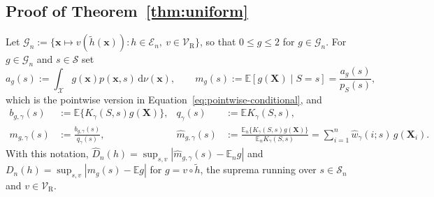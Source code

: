 \subsection{Proof of Theorem~\ref{thm:uniform}}
\label{app:proof-uniform}

Let $\mathcal{G}_n:=\{\mathbf{x}\mapsto v(\widetilde{h}(\mathbf{x})):h\in\mathcal{E}_n,\ v\in\mathcal{V}_{\mathrm{R}}\}$, so that $0\le g\le2$ for $g\in\mathcal{G}_n$.  For $g\in\mathcal{G}_n$ and $s\in\mathcal{S}$ set
\[
  a_g(s):=\int_{\mathcal{X}}g(\mathbf{x})p(\mathbf{x},s)\,\mathrm{d}\nu(\mathbf{x}),
  \qquad
  m_g(s):=\mathbb{E}[g(\mathbf{X})\mid S=s]=\frac{a_g(s)}{p_S(s)},
\]
which is the pointwise version in Equation~\ref{eq:pointwise-conditional}, and
\begin{align*}
  b_{g,\gamma}(s)&:=\mathbb{E}\{K_{\gamma}(S,s)g(\mathbf{X})\},&
  q_\gamma(s)&:=\mathbb{E}K_{\gamma}(S,s),\\
  m_{g,\gamma}(s)&:=\frac{b_{g,\gamma}(s)}{q_\gamma(s)},&
  \widehat{m}_{g,\gamma}(s)
  &:=\frac{\mathbb{E}_n\{K_{\gamma}(S,s)g(\mathbf{X})\}}{\mathbb{E}_nK_{\gamma}(S,s)}
   =\sum_{i=1}^n\widehat{w}_{\gamma}(i;s)\,g(\mathbf{X}_i).
\end{align*}
With this notation, $\widehat{D}_n(h)=\sup_{s,v}|\widehat{m}_{g,\gamma}(s)-\mathbb{E}_ng|$ and $D_n(h)=\sup_{s,v}|m_g(s)-\mathbb{E}g|$ for $g=v\circ\widetilde{h}$, the suprema running over $s\in\mathcal{S}_n$ and $v\in\mathcal{V}_{\mathrm{R}}$.

